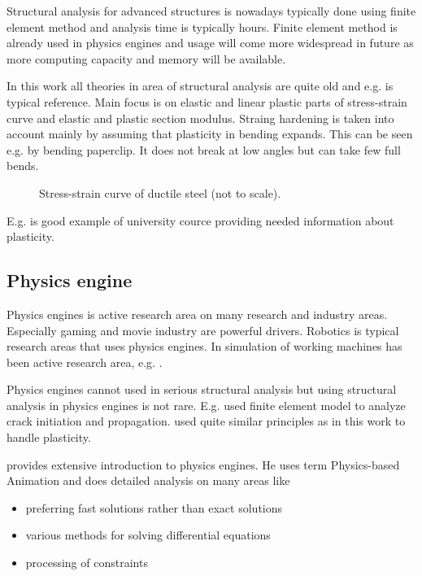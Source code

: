 Structural analysis for advanced structures is nowadays typically done using finite element method and 
analysis time is typically hours. Finite element method is already used in physics engines and usage will come 
more widespread in future as more computing capacity and memory will be available.

In this work all theories in area of structural analysis are quite old and e.g. 
\cite{timoshenko} is typical reference. Main focus is on elastic and 
linear plastic parts of stress-strain curve and elastic and plastic section modulus.
Straing hardening is taken into account mainly by assuming that plasticity in bending expands.
This can be seen e.g. by bending paperclip. It does not break at low angles but can take few full bends.

\begin{figure}[htb!]
\centering
{}
\caption{Stress-strain curve of ductile steel (not to scale).}
\label{fig:areas}
\end{figure}

E.g. \cite{camp} is good example of university cource providing needed information about plasticity.

\subsection{Physics engine}

Physics engines is active research area on many research and industry areas.
Especially gaming and movie industry are powerful drivers.
Robotics is typical research areas that uses physics engines.
In \lut simulation of working machines has been active research area, e.g. \cite{moisio.thesis}.

Physics engines cannot used in serious structural analysis but using structural analysis in physics engines is not rare.  
E.g. \cite{Obrien:1999:GMA} used finite element model to analyze crack initiation and propagation.
\cite{cg1988} used quite similar principles as in this work to handle plasticity. 

\cite{erleben.thesis} provides extensive introduction to physics engines. 
He uses term Physics-based Animation and does detailed analysis on many areas like
\begin{itemize}
\item preferring fast solutions rather than exact solutions
\item various methods for solving differential equations
\item processing of constraints
\end{itemize}

